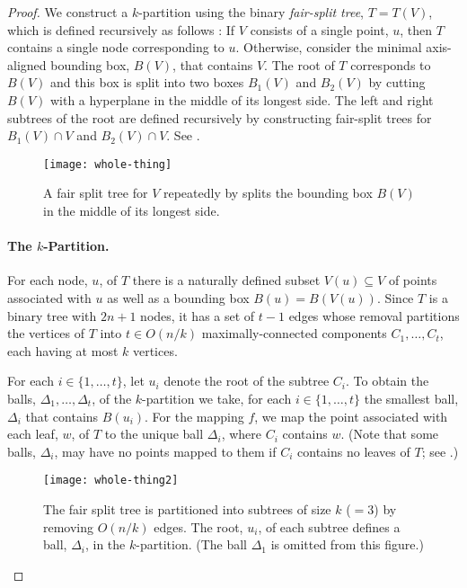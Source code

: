 \documentclass{patmorin}
\begin{document}
\begin{proof}
  We construct a $k$-partition using the binary \emph{fair-split
  tree}, $T=T(V)$, which is defined recursively as follows
  \cite{callahan.kosaraju:decomposition}: If $V$ consists of a single
  point, $u$, then $T$ contains a single node corresponding to $u$.
  Otherwise, consider the minimal axis-aligned bounding box, $B(V)$,
  that contains $V$.  The root of $T$ corresponds to $B(V)$ and this
  box is split into two boxes $B_1(V)$ and $B_2(V)$ by cutting $B(V)$
  with a hyperplane in the middle of its longest side.  The left and
  right subtrees of the root are defined recursively by constructing
  fair-split trees for $B_1(V)\cap V$ and $B_2(V)\cap V$. See .

  \begin{figure}
    \begin{center}
      \texttt{[image: whole-thing]}
    \end{center}
    \caption{A fair split tree for $V$ repeatedly by splits the bounding
      box $B(V)$ in the middle of its longest side.}
  \end{figure}

  \paragraph{The $k$-Partition.}
  For each node, $u$, of $T$ there is a naturally defined subset
  $V(u)\subseteq V$ of points associated with $u$ as well as a bounding
  box $B(u)=B(V(u))$.  Since $T$ is a binary tree with $2n+1$ nodes, it
  has a set of $t-1$ edges whose removal partitions the vertices of $T$
  into $t\in O(n/k)$ maximally-connected components $C_1,\ldots,C_t$,
  each having at most $k$ vertices.

  For each $i\in\{1,\ldots,t\}$, let $u_i$ denote the root of the
  subtree $C_i$.  To obtain the balls, $\Delta_1,\ldots,\Delta_t$, of
  the $k$-partition we take, for each $i\in\{1,\ldots,t\}$ the smallest
  ball, $\Delta_i$ that contains $B(u_i)$.  For the mapping $f$, we
  map the point associated with each leaf, $w$, of $T$ to the unique
  ball $\Delta_i$, where $C_i$ contains $w$.  (Note that some balls,
  $\Delta_i$, may have no points mapped to them if $C_i$ contains no
  leaves of $T$; see .)

  \begin{figure}
    \begin{center}
      \texttt{[image: whole-thing2]}
    \end{center}
    \caption{The fair split tree is partitioned into subtrees of size
    $k$ (${}=3$) by removing $O(n/k)$ edges.  The root, $u_i$, of each subtree
    defines a ball, $\Delta_i$, in the $k$-partition. (The ball $\Delta_1$
    is omitted from this figure.)}
  \end{figure}



\end{proof}
\end{document}
